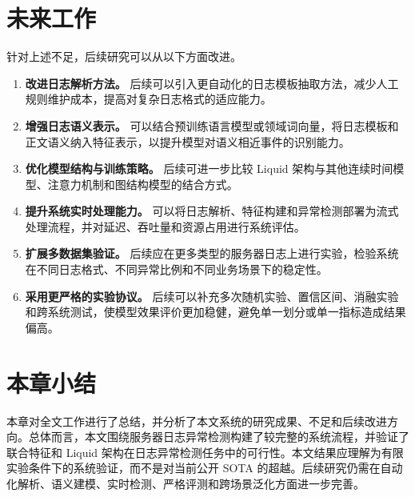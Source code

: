\section{未来工作}

针对上述不足，后续研究可以从以下方面改进。

\begin{enumerate}
    \item \textbf{改进日志解析方法。} 后续可以引入更自动化的日志模板抽取方法，减少人工规则维护成本，提高对复杂日志格式的适应能力。
    
    \item \textbf{增强日志语义表示。} 可以结合预训练语言模型或领域词向量，将日志模板和正文语义纳入特征表示，以提升模型对语义相近事件的识别能力。
    
    \item \textbf{优化模型结构与训练策略。} 后续可进一步比较 Liquid 架构与其他连续时间模型、注意力机制和图结构模型的结合方式。
    
    \item \textbf{提升系统实时处理能力。} 可以将日志解析、特征构建和异常检测部署为流式处理流程，并对延迟、吞吐量和资源占用进行系统评估。
    
    \item \textbf{扩展多数据集验证。} 后续应在更多类型的服务器日志上进行实验，检验系统在不同日志格式、不同异常比例和不同业务场景下的稳定性。
    
    \item \textbf{采用更严格的实验协议。} 后续可以补充多次随机实验、置信区间、消融实验和跨系统测试，使模型效果评价更加稳健，避免单一划分或单一指标造成结果偏高。
\end{enumerate}

\section{本章小结}

本章对全文工作进行了总结，并分析了本文系统的研究成果、不足和后续改进方向。总体而言，本文围绕服务器日志异常检测构建了较完整的系统流程，并验证了联合特征和 Liquid 架构在日志异常检测任务中的可行性。本文结果应理解为有限实验条件下的系统验证，而不是对当前公开 SOTA 的超越。后续研究仍需在自动化解析、语义建模、实时检测、严格评测和跨场景泛化方面进一步完善。
